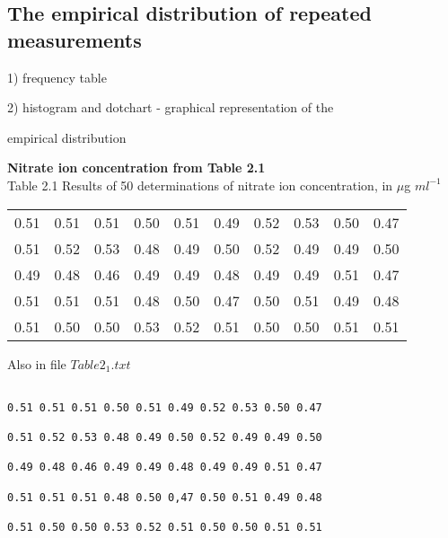  

\subsection{The empirical distribution of repeated measurements}

1) frequency table

2) histogram and dotchart - graphical representation of the

empirical distribution

 



\textbf{Nitrate ion concentration from Table 2.1}\\

Table 2.1 Results of 50 determinations of nitrate ion concentration, in $\mu$g $ml^{-1}$

\begin{tabular}{|c|c|c|c|c|c|c|c|c|c|}

  \hline

0.51 &0.51 &0.51 &0.50 &0.51 &0.49 &0.52 &0.53 &0.50 &0.47\\

0.51 &0.52 &0.53 &0.48 &0.49 &0.50 &0.52 &0.49 &0.49 &0.50\\

0.49 &0.48 &0.46 &0.49 &0.49 &0.48 &0.49 &0.49 &0.51 &0.47\\

0.51 &0.51 &0.51 &0.48 &0.50 &0.47 &0.50 &0.51 &0.49 &0.48\\

0.51 &0.50 &0.50 &0.53 &0.52 &0.51 &0.50 &0.50 &0.51 &0.51\\

  \hline

\end{tabular}

 

Also in file $Table2_1.txt$

\begin{verbatim}

0.51 0.51 0.51 0.50 0.51 0.49 0.52 0.53 0.50 0.47

0.51 0.52 0.53 0.48 0.49 0.50 0.52 0.49 0.49 0.50

0.49 0.48 0.46 0.49 0.49 0.48 0.49 0.49 0.51 0.47

0.51 0.51 0.51 0.48 0.50 0,47 0.50 0.51 0.49 0.48

0.51 0.50 0.50 0.53 0.52 0.51 0.50 0.50 0.51 0.51

\end{verbatim}

